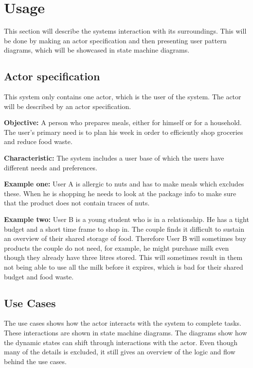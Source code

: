 \section{Usage}\label{Usage}
This section will describe the systems interaction with its surroundings. This will be done by making an actor specification and then presenting user pattern diagrams, which will be showcased in state machine diagrams.

\subsection{Actor specification}
\label{Actor_specification}
This system only contains one actor, which is the user of the system. The actor will be described by an actor specification.

\textbf{Objective:} A person who prepares meals, either for himself or for a household. The user's primary need is to plan his week in order to efficiently shop groceries and reduce food waste.

\textbf{Characteristic:} The system includes a user base of which the users have different needs and preferences.

\textbf{Example one:} User A is allergic to nuts and has to make meals which excludes these. When he is shopping he needs to look at the package info to make sure that the product does not contain traces of nuts.

\textbf{Example two:} User B is a young student who is in a relationship. He has a tight budget and a short time frame to shop in. The couple finds it difficult to sustain an overview of their shared storage of food. Therefore User B will sometimes buy products the couple do not need, for example, he might purchase milk even though they already have three litres stored. This will sometimes result in them not being able to use all the milk before it expires, which is bad for their shared budget and food waste.



\subsection{Use Cases}
The use cases shows how the actor interacts with the system to complete tasks. These interactions are shown in state machine diagrams. The diagrams show how the dynamic states can shift through interactions with the actor. Even though many of the details is excluded, it still gives an overview of the logic and flow behind the use cases.

